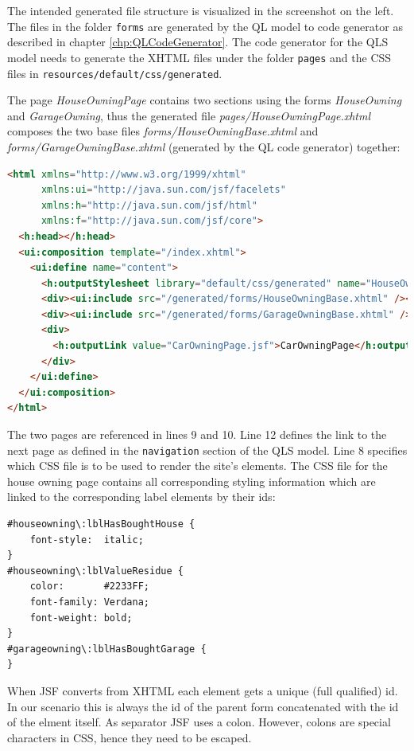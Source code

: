 The intended generated file structure is visualized in the screenshot on the
left. The files in the folder \texttt{forms} are generated by the QL model to
code generator as described in chapter \ref{chp:QLCodeGenerator}. The code
generator for the QLS model needs to generate the XHTML files under the folder
\texttt{pages} and the CSS files in \texttt{resources/default/css/generated}.

The page \emph{HouseOwningPage} contains two sections using the forms \emph{HouseOwning} 
and \emph{GarageOwning}, thus the generated file \emph{pages/HouseOwningPage.xhtml} composes
the two base files \emph{forms/HouseOwningBase.xhtml} and \emph{forms/GarageOwningBase.xhtml}
(generated by the QL code generator) together:

\begin{lstlisting}[language=HTML]
<html xmlns="http://www.w3.org/1999/xhtml"
      xmlns:ui="http://java.sun.com/jsf/facelets"
      xmlns:h="http://java.sun.com/jsf/html"
      xmlns:f="http://java.sun.com/jsf/core">
  <h:head></h:head>
  <ui:composition template="/index.xhtml">
    <ui:define name="content">
      <h:outputStylesheet library="default/css/generated" name="HouseOwningPage.css"  />
      <div><ui:include src="/generated/forms/HouseOwningBase.xhtml" /></div><p/>
      <div><ui:include src="/generated/forms/GarageOwningBase.xhtml" /></div>
  	  <div>
  	    <h:outputLink value="CarOwningPage.jsf">CarOwningPage</h:outputLink>
  	  </div>
    </ui:define>
  </ui:composition>
</html>
\end{lstlisting}

The two pages are referenced in lines 9 and 10. Line 12 defines the link to the
next page as defined in the \texttt{navigation} section of the QLS model. Line 8
specifies which CSS file is to be used to render the site's elements. The CSS
file for the house owning page contains all corresponding styling information 
which are linked to the corresponding label elements by their ids:

\begin{lstlisting}[language=HTML]
#houseowning\:lblHasBoughtHouse {
	font-style:  italic; 	
}
#houseowning\:lblValueResidue {
	color:       #2233FF; 
	font-family: Verdana; 	
	font-weight: bold; 		
}
#garageowning\:lblHasBoughtGarage {
}
\end{lstlisting}

When JSF converts from XHTML each element gets a unique (full qualified) id. In
our scenario this is always the id of the parent form concatenated with the id
of the elment itself. As separator JSF uses a colon. However, colons are special characters
in CSS, hence they need to be escaped.

